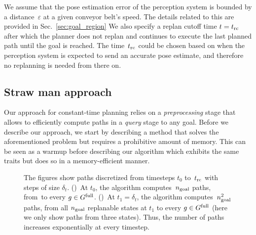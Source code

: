 \documentclass[a4paper]{report}
\begin{document}
{%
}
We assume that the pose estimation error of the perception system is bounded by a distance~$\varepsilon$ at a given conveyor belt's speed. The details related to this are provided in Sec.~\ref{sec:goal_region}
We also specify a replan cutoff time $t=t_{\textrm{rc}}$ after which the planner does not replan and continues to execute the last planned path until the goal is reached. The time~$t_{\textrm{rc}}$ could be chosen based on when the perception system is expected to send an accurate pose estimate, and therefore no replanning is needed from there on.


\subsection{Straw man approach}
\label{subsec:strawman}
Our approach for constant-time planning relies on a \emph{preprocessing} stage that allows to efficiently compute paths in a \emph{query} stage to any goal.
%
Before we describe our approach, we start by describing a \naive method that solves the aforementioned problem but requires a prohibitive amount of memory.
%
This can be seen as a warmup before describing our algorithm which exhibits the same traits but does so in a memory-efficient manner.

\begin{figure*}[t]
    \centering
    \begin{subfigure}{.49\textwidth}
        \caption{}
        \label{fig:naive1}
    \end{subfigure}
    \begin{subfigure}{0.49\textwidth}
        \caption{}
        \label{fig:naive2}
    \end{subfigure}
    \caption{
    \CaptionTextSize
    The figures show paths discretized from timesteps $t_0$ to~$t_{\textrm{rc}}$ with steps of size $\delta_t$.
    ()~At $t_0$, the algorithm computes~$n_{\rm goal}$ paths, from~\Shome to every $g \in G^{\textrm{full}}$.
    ()~At $t_1 = \delta_t$, the algorithm computes~$n_{\rm goal}^2$ paths, from all $n_{\rm goal}$ replanable states at $t_1$ to every $g \in G^{\textrm{full}}$ (here we only show paths from three states).
    Thus, the number of paths increases exponentially at every timestep.
    }
    \label{fig:naive}
\end{figure*}
\end{document}
